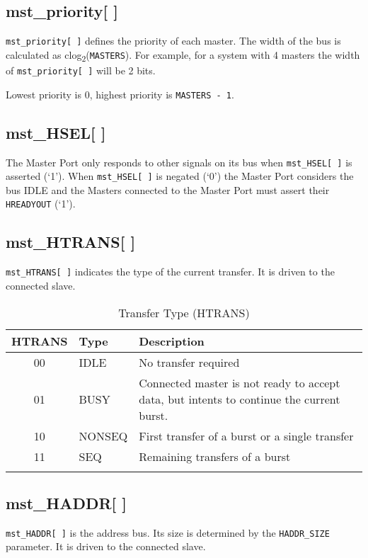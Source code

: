 \subsection{mst\_priority[ ]}\label{mst_priority}

\texttt{mst\_priority[\,]} defines the priority of each master. The width of the bus is calculated as clog\textsubscript{2}(\texttt{MASTERS}). For example, for a system with 4 masters the width of \texttt{mst\_priority[\,]} will be 2 bits.

Lowest priority is 0, highest priority is \texttt{MASTERS - 1}.

\subsection{mst\_HSEL[ ]}\label{mst_hsel}

The Master Port only responds to other signals on its bus when \texttt{mst\_HSEL[\,]} is
asserted (`1'). When \texttt{mst\_HSEL[\,]} is negated (`0') the Master Port
considers the bus IDLE and the Masters connected to the Master Port must assert their
\texttt{HREADYOUT} (`1').

\subsection{mst\_HTRANS[ ]}\label{mst_htrans}

\texttt{mst\_HTRANS[ ]} indicates the type of the current transfer. It is driven to
the connected slave.

\begin{longtable}[]{@{}clp{9cm}@{}}
\toprule
HTRANS & Type & Description\tabularnewline
\midrule
\endhead
00 & IDLE & No transfer required\tabularnewline
01 & BUSY & Connected master is not ready to accept data, but intents to
continue the current burst.\tabularnewline
10 & NONSEQ & First transfer of a burst or a single
transfer\tabularnewline
11 & SEQ & Remaining transfers of a burst\tabularnewline
\bottomrule
\caption{Transfer Type (HTRANS)}
\end{longtable}


\subsection{mst\_HADDR[ ]}\label{mst_haddr}

\texttt{mst\_HADDR[\,]} is the address bus. Its size is determined by the \texttt{HADDR\_SIZE}
parameter. It is driven to the connected slave.

